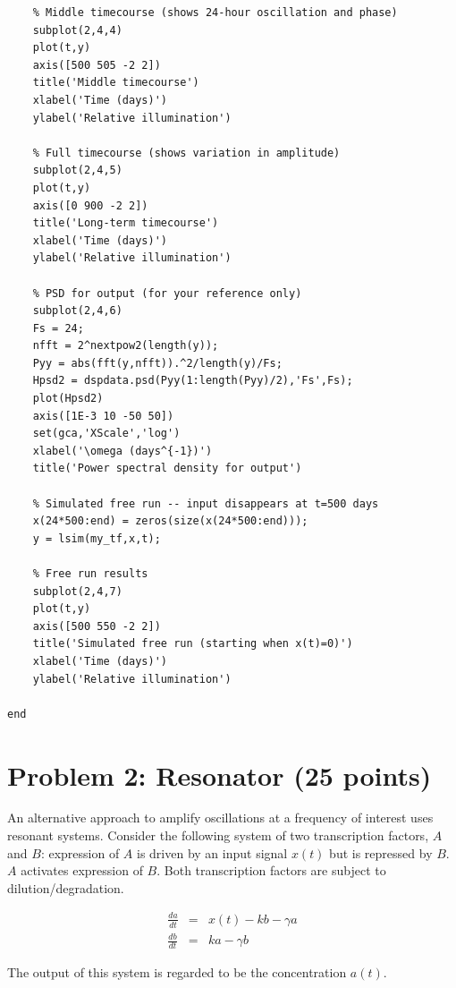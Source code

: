 \documentclass{article}
\begin{document}
\begin{enumerate}[a)]
\begin{lstlisting}
    % Middle timecourse (shows 24-hour oscillation and phase)
    subplot(2,4,4)
    plot(t,y)
    axis([500 505 -2 2])
    title('Middle timecourse')
    xlabel('Time (days)')
    ylabel('Relative illumination')
    
    % Full timecourse (shows variation in amplitude)
    subplot(2,4,5)
    plot(t,y)
    axis([0 900 -2 2])
    title('Long-term timecourse')
    xlabel('Time (days)')
    ylabel('Relative illumination')
    
    % PSD for output (for your reference only)
    subplot(2,4,6)
    Fs = 24;
    nfft = 2^nextpow2(length(y));
    Pyy = abs(fft(y,nfft)).^2/length(y)/Fs;
    Hpsd2 = dspdata.psd(Pyy(1:length(Pyy)/2),'Fs',Fs);  
    plot(Hpsd2)
    axis([1E-3 10 -50 50])
    set(gca,'XScale','log')
    xlabel('\omega (days^{-1})')
    title('Power spectral density for output')
    
    % Simulated free run -- input disappears at t=500 days
    x(24*500:end) = zeros(size(x(24*500:end)));
    y = lsim(my_tf,x,t);
    
    % Free run results
    subplot(2,4,7)
    plot(t,y)
    axis([500 550 -2 2])
    title('Simulated free run (starting when x(t)=0)')
    xlabel('Time (days)')
    ylabel('Relative illumination')
    
end
\end{lstlisting}
\end{enumerate}



\section*{Problem 2: Resonator (25 points)}

An alternative approach to amplify oscillations at a frequency of interest uses resonant systems. Consider the following system of two transcription factors, $A$ and $B$: expression of $A$ is driven by an input signal $x(t)$ but is repressed by $B$. $A$ activates expression of $B$. Both transcription factors are subject to dilution/degradation.

\begin{eqnarray*}
\frac{da}{dt} & = & x(t) - k b - \gamma a\\
\frac{db}{dt} & = & ka - \gamma b
\end{eqnarray*}

The output of this system is regarded to be the concentration $a(t)$.
\end{document}
